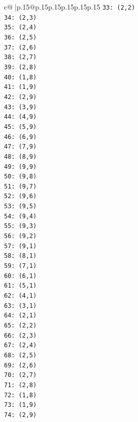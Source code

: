 \documentclass{article}
\begin{document}
{\begin{supertabular}{c@{$\;$}|p{.15\linewidth}@{}p{.15\linewidth}p{.15\linewidth}p{.15\linewidth}p{.15\linewidth}p{.15\linewidth}}
{{{\texttt{33: (2,2)} \\
\texttt{34: (2,3)} \\
\texttt{35: (2,4)} \\
\texttt{36: (2,5)} \\
\texttt{37: (2,6)} \\
\texttt{38: (2,7)} \\
\texttt{39: (2,8)} \\
\texttt{40: (1,8)} \\
\texttt{41: (1,9)} \\
\texttt{42: (2,9)} \\
\texttt{43: (3,9)} \\
\texttt{44: (4,9)} \\
\texttt{45: (5,9)} \\
\texttt{46: (6,9)} \\
\texttt{47: (7,9)} \\
\texttt{48: (8,9)} \\
\texttt{49: (9,9)} \\
\texttt{50: (9,8)} \\
\texttt{51: (9,7)} \\
\texttt{52: (9,6)} \\
\texttt{53: (9,5)} \\
\texttt{54: (9,4)} \\
\texttt{55: (9,3)} \\
\texttt{56: (9,2)} \\
\texttt{57: (9,1)} \\
\texttt{58: (8,1)} \\
\texttt{59: (7,1)} \\
\texttt{60: (6,1)} \\
\texttt{61: (5,1)} \\
\texttt{62: (4,1)} \\
\texttt{63: (3,1)} \\
\texttt{64: (2,1)} \\
\texttt{65: (2,2)} \\
\texttt{66: (2,3)} \\
\texttt{67: (2,4)} \\
\texttt{68: (2,5)} \\
\texttt{69: (2,6)} \\
\texttt{70: (2,7)} \\
\texttt{71: (2,8)} \\
\texttt{72: (1,8)} \\
\texttt{73: (1,9)} \\
\texttt{74: (2,9)} \\
}}}
\end{supertabular}}
\end{document}

